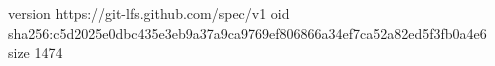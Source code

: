 version https://git-lfs.github.com/spec/v1
oid sha256:c5d2025e0dbc435e3eb9a37a9ca9769ef806866a34ef7ca52a82ed5f3fb0a4e6
size 1474
